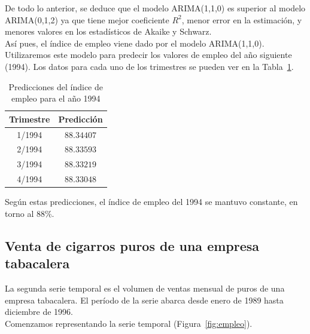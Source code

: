 \documentclass[12pt,a4paper,twoside,openright,titlepage,final]{article}
\begin{document}
De todo lo anterior, se deduce que el modelo ARIMA(1,1,0) es superior al modelo ARIMA(0,1,2) ya que tiene mejor coeficiente $R^2$, menor error en la estimación, y menores valores en los estadísticos de Akaike y Schwarz.\\

Así pues, el índice de empleo viene dado por el modelo ARIMA(1,1,0).\\

Utilizaremos este modelo para predecir los valores de empleo del año siguiente (1994). Los datos para cada uno de los trimestres se pueden ver en la Tabla~\ref{tbl:empleo-predicciones}.\\

 \begin{table}[htbp!]
 	\centering
 	\caption{Predicciones del índice de empleo para el año 1994}
 	\label{tbl:empleo-predicciones}
 	\begin{tabular}{@{}cc@{}}
 		\toprule
 		\textbf{Trimestre} & \textbf{Predicción} \\ \midrule
 		1/1994             & $88.34407$          \\
 		2/1994             & $88.33593$          \\
 		3/1994             & $88.33219$          \\
 		4/1994             & $88.33048$          \\ \bottomrule
 	\end{tabular}
 \end{table}

Según estas predicciones, el índice de empleo del 1994 se mantuvo constante, en torno al 88\%. 


\clearpage

\subsection{Venta de cigarros puros de una empresa tabacalera}

La segunda serie temporal es el volumen de ventas mensual de puros de una empresa tabacalera. El período de la serie abarca desde enero de 1989 hasta diciembre de 1996.\\

Comenzamos representando la serie temporal (Figura~\ref{fig:empleo}).\\
\end{document}

